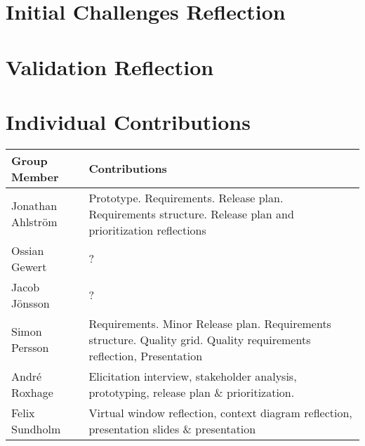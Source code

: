 \documentclass[a4paper]{article}
\begin{document}
\section{Initial Challenges Reflection}


\section{Validation Reflection}


\section*{Individual Contributions}

\begin{tabular}{|l|p{10cm}|}
    \hline
    \textbf{Group Member} & \textbf{Contributions} \\
    \hline
    Jonathan Ahlström & Prototype. Requirements. Release plan. Requirements structure. Release plan and prioritization reflections \\
    \hline
    Ossian Gewert & ? \\
    \hline
    Jacob Jönsson & ? \\
    \hline
    Simon Persson & Requirements. Minor Release plan. Requirements structure. Quality grid. Quality requirements reflection, Presentation \\
    \hline
    André Roxhage & Elicitation interview, stakeholder analysis, prototyping, release plan \& prioritization.  \\
    \hline
    Felix Sundholm & Virtual window reflection, context diagram reflection, presentation slides \& presentation \\
    \hline
\end{tabular}
\end{document}
